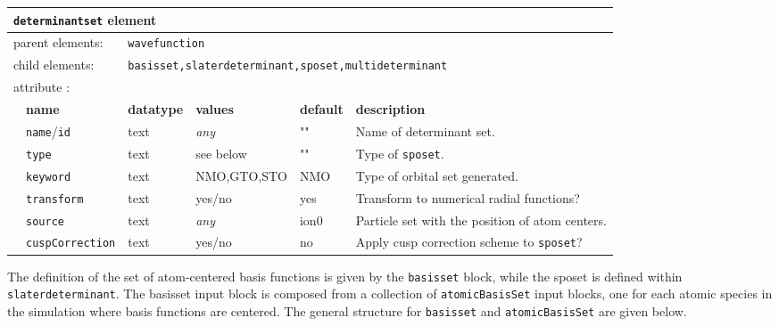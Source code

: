 \begin{table}[h]
\begin{center}
\begin{tabularx}{\textwidth}{l l l l l l }
\hline
\multicolumn{6}{l}{\texttt{determinantset} element} \\
\hline
\multicolumn{2}{l}{parent elements:} & \multicolumn{4}{l}{\texttt{wavefunction}}\\
\multicolumn{2}{l}{child  elements:} & \multicolumn{4}{l}{\texttt{basisset,slaterdeterminant,sposet,multideterminant}}\\
\multicolumn{2}{l}{attribute      :} & \multicolumn{4}{l}{}\\
   &   \bfseries name              & \bfseries datatype & \bfseries values & \bfseries default   & \bfseries description \\
   &   \texttt{name}/\texttt{id}   &  text              &  \textit{any}    &  ""             & Name of determinant set. \\
   &   \texttt{type}                    &  text               &   see below   &   ""            &  Type of \texttt{sposet}. \\
   &   \texttt{keyword}             &  text               &   NMO,GTO,STO   &  NMO        & Type of orbital set generated. \\  
   &   \texttt{transform}           &  text               &   yes/no          &  yes         &  Transform to numerical radial functions?  \\
   &   \texttt{source}               &  text               &   \textit{any}    &  ion0        & Particle set with the position of atom centers. \\
   &   \texttt{cuspCorrection}  &  text               &   yes/no          &  no         & Apply cusp correction scheme to \texttt{sposet}? \\
  \hline
\end{tabularx}
\end{center}
\end{table}

The definition of the set of atom-centered basis functions is given by the \texttt{basisset} block, while the sposet is defined within \texttt{slaterdeterminant}. The basisset input block is composed from a collection of \texttt{atomicBasisSet} input blocks, one for each atomic species in the simulation where basis functions are centered. The general structure for \texttt{basisset} and \texttt{atomicBasisSet} are given below.

